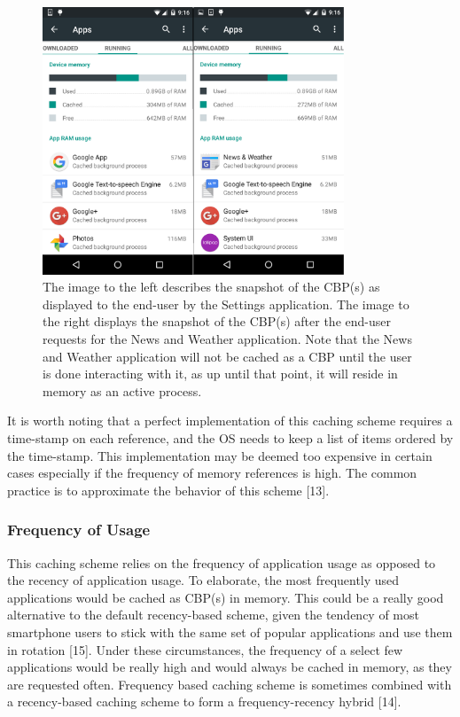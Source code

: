 \documentclass[12pt]{uthesis-v12}  %
\begin{document}
				\begin{figure}[!ht]
					\centering
					\includegraphics[width = 90mm]{images/beforeAndAfterNews.png}
					\caption[Before \& After News Application Launch]
					{The image to the left describes the snapshot of the CBP(s) as displayed to the end-user by the Settings application. The image to the right displays the snapshot of the CBP(s) after the end-user requests for the News and Weather application. Note that the News and Weather application will not be cached as a CBP until the user is done interacting with it, as up until that point, it will reside in memory as an active process.}
				\end{figure}				
				
				It is worth noting that a perfect implementation of this caching scheme requires a time-stamp on each reference, and the OS needs to keep a list of items ordered by the time-stamp. This implementation may be deemed too expensive in certain cases especially if the frequency of memory references is high. The common practice is to approximate the behavior of this scheme [13].
			
			\subsubsection{Frequency of Usage}
				This caching scheme relies on the frequency of application usage as opposed to the recency of application usage. To elaborate, the most frequently used applications would be cached as CBP(s) in memory. This could be a really good alternative to the default recency-based scheme, given the tendency of most smartphone users to stick with the same set of popular applications and use them in rotation [15]. Under these circumstances, the frequency of a select few applications would be really high and would always be cached in memory, as they are requested often. Frequency based caching scheme is sometimes combined with a recency-based caching scheme to form a frequency-recency hybrid [14].
				 
\end{document}
